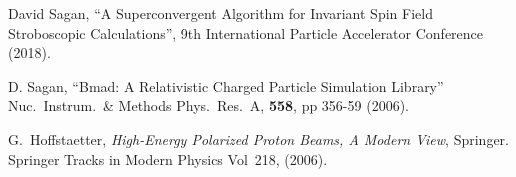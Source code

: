 \documentclass{hitec}
\begin{document}
\begin{thebibliography}{9}

David Sagan, 
``A Superconvergent Algorithm for Invariant Spin Field Stroboscopic Calculations'',
9th International Particle Accelerator Conference (2018).

D. Sagan,
``Bmad: A Relativistic Charged Particle Simulation Library''
Nuc.\ Instrum.\ \& Methods Phys.\ Res.\ A, {\bf 558}, pp 356-59 (2006).

G.~Hoffstaetter, 
{\it High-Energy Polarized Proton Beams, A Modern View}, 
Springer. Springer Tracks in Modern Physics Vol~218, (2006).

\end{thebibliography}
\end{document}
